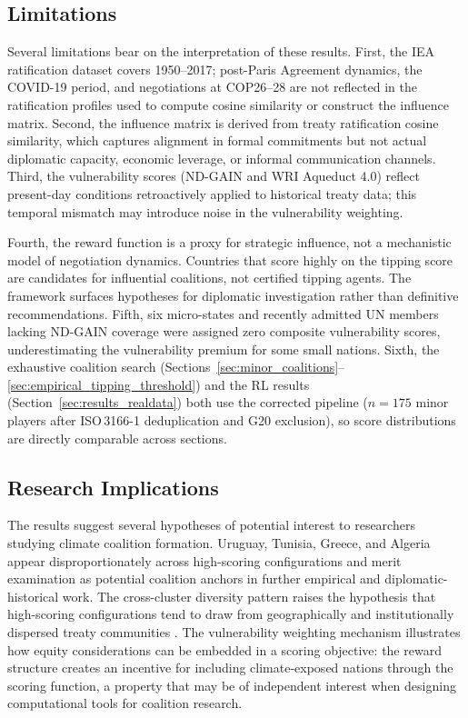 \documentclass[11pt]{article}
\begin{document}
\subsection*{Limitations}

Several limitations bear on the interpretation of these results. First, the IEA ratification dataset covers 1950--2017; post-Paris Agreement dynamics, the COVID-19 period, and negotiations at COP26--28 are not reflected in the ratification profiles used to compute cosine similarity or construct the influence matrix. Second, the influence matrix is derived from treaty ratification cosine similarity, which captures alignment in formal commitments but not actual diplomatic capacity, economic leverage, or informal communication channels. Third, the vulnerability scores (ND-GAIN and WRI Aqueduct 4.0) reflect present-day conditions retroactively applied to historical treaty data; this temporal mismatch may introduce noise in the vulnerability weighting.

Fourth, the reward function is a proxy for strategic influence, not a mechanistic model of negotiation dynamics. Countries that score highly on the tipping score are candidates for influential coalitions, not certified tipping agents. The framework surfaces hypotheses for diplomatic investigation rather than definitive recommendations. Fifth, six micro-states and recently admitted UN members lacking ND-GAIN coverage were assigned zero composite vulnerability scores, underestimating the vulnerability premium for some small nations. Sixth, the exhaustive coalition search (Sections~\ref{sec:minor_coalitions}--\ref{sec:empirical_tipping_threshold}) and the RL results (Section~\ref{sec:results_realdata}) both use the corrected pipeline ($n = 175$ minor players after ISO\,3166-1 deduplication and G20 exclusion), so score distributions are directly comparable across sections.

\subsection*{Research Implications}

The results suggest several hypotheses of potential interest to researchers studying climate coalition formation. Uruguay, Tunisia, Greece, and Algeria appear disproportionately across high-scoring configurations and merit examination as potential coalition anchors in further empirical and diplomatic-historical work. The cross-cluster diversity pattern raises the hypothesis that high-scoring configurations tend to draw from geographically and institutionally dispersed treaty communities \citep{keohane2011regime, ostrom2010polycentric}. The vulnerability weighting mechanism illustrates how equity considerations can be embedded in a scoring objective: the reward structure creates an incentive for including climate-exposed nations through the scoring function, a property that may be of independent interest when designing computational tools for coalition research.
\end{document}
